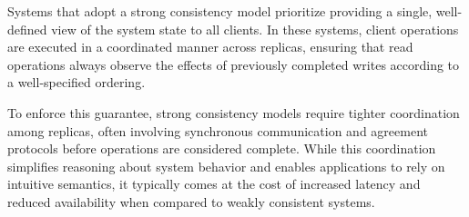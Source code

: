 Systems that adopt a strong consistency model prioritize providing a single, well-defined view of the system state to all clients. In these systems, client operations are executed in a coordinated manner across replicas, ensuring that read operations always observe the effects of previously completed writes according to a well-specified ordering.

To enforce this guarantee, strong consistency models require tighter coordination among replicas, often involving synchronous communication and agreement protocols before operations are considered complete. While this coordination simplifies reasoning about system behavior and enables applications to rely on intuitive semantics, it typically comes at the cost of increased latency and reduced availability when compared to weakly consistent systems.

